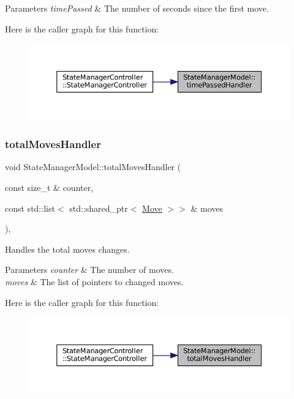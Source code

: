 \begin{DoxyParams}{Parameters}
{\em time\+Passed} & The number of seconds since the first move. \\
\hline
\end{DoxyParams}
Here is the caller graph for this function\+:
\nopagebreak
\begin{figure}[H]
\begin{center}
\leavevmode
\includegraphics[width=350pt]{class_state_manager_model_ab3f4c9b1d44a75c63c034e79f88ee9f0_icgraph}
\end{center}
\end{figure}
\mbox{\label{class_state_manager_model_a692ae20069405c9ace78f1d403046d8c}} 
\subsubsection{\texorpdfstring{totalMovesHandler}{totalMovesHandler}}
{\footnotesize\ttfamily void State\+Manager\+Model\+::total\+Moves\+Handler (\begin{DoxyParamCaption}\item[{const size\+\_\+t \&}]{counter,  }\item[{const std\+::list$<$ std\+::shared\+\_\+ptr$<$ \mbox{\hyperlink{struct_move}{Move}} $>$$>$ \&}]{moves }\end{DoxyParamCaption})\hspace{0.3cm}{\ttfamily [inline]}, {\ttfamily [slot]}}



Handles the total moves changes. 


\begin{DoxyParams}{Parameters}
{\em counter} & The number of moves. \\
\hline
{\em moves} & The list of pointers to changed moves. \\
\hline
\end{DoxyParams}
Here is the caller graph for this function\+:
\nopagebreak
\begin{figure}[H]
\begin{center}
\leavevmode
\includegraphics[width=350pt]{class_state_manager_model_a692ae20069405c9ace78f1d403046d8c_icgraph}
\end{center}
\end{figure}



